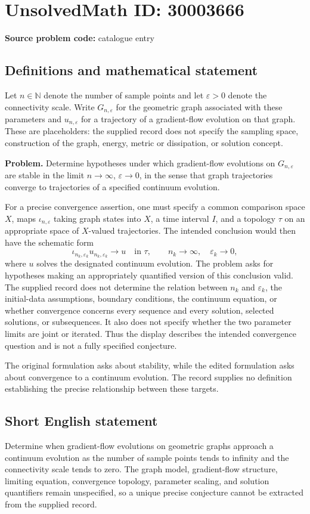 \documentclass[11pt]{article}
\newcommand{\N}{\mathbb{N}}
\begin{document}
\section*{UnsolvedMath ID: 30003666}
\textbf{Source problem code:} catalogue entry
\subsection{Definitions and mathematical statement}
Let \(n\in\N\) denote the number of sample points and let \(\varepsilon>0\) denote the connectivity scale. Write \(G_{n,\varepsilon}\) for the geometric graph associated with these parameters and \(u_{n,\varepsilon}\) for a trajectory of a gradient-flow evolution on that graph. These are placeholders: the supplied record does not specify the sampling space, construction of the graph, energy, metric or dissipation, or solution concept.

\textbf{Problem.} Determine hypotheses under which gradient-flow evolutions on \(G_{n,\varepsilon}\) are stable in the limit \(n\to\infty\), \(\varepsilon\to0\), in the sense that graph trajectories converge to trajectories of a specified continuum evolution.

For a precise convergence assertion, one must specify a common comparison space \(X\), maps \(\iota_{n,\varepsilon}\) taking graph states into \(X\), a time interval \(I\), and a topology \(\tau\) on an appropriate space of \(X\)-valued trajectories. The intended conclusion would then have the schematic form
\[
\iota_{n_k,\varepsilon_k}u_{n_k,\varepsilon_k}
\longrightarrow u\quad\text{in }\tau,
\qquad n_k\to\infty,\quad \varepsilon_k\to0,
\]
where \(u\) solves the designated continuum evolution. The problem asks for hypotheses making an appropriately quantified version of this conclusion valid. The supplied record does not determine the relation between \(n_k\) and \(\varepsilon_k\), the initial-data assumptions, boundary conditions, the continuum equation, or whether convergence concerns every sequence and every solution, selected solutions, or subsequences. It also does not specify whether the two parameter limits are joint or iterated. Thus the display describes the intended convergence question and is not a fully specified conjecture.

The original formulation asks about stability, while the edited formulation asks about convergence to a continuum evolution. The record supplies no definition establishing the precise relationship between these targets.
\subsection{Short English statement}
Determine when gradient-flow evolutions on geometric graphs approach a continuum evolution as the number of sample points tends to infinity and the connectivity scale tends to zero. The graph model, gradient-flow structure, limiting equation, convergence topology, parameter scaling, and solution quantifiers remain unspecified, so a unique precise conjecture cannot be extracted from the supplied record.
\end{document}
